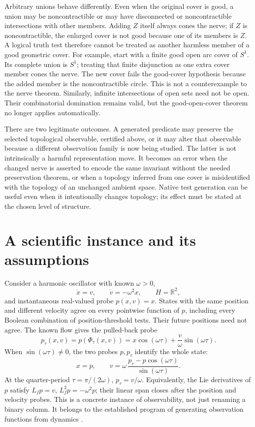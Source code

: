\documentclass[11pt]{article}
\theoremstyle{definition}
\begin{document}
Arbitrary unions behave differently. Even when the original cover is
good, a union may be noncontractible or may have disconnected or
noncontractible intersections with other members. Adding $Z$ itself
always cones the nerve; if $Z$ is noncontractible, the enlarged cover
is not good because one of its members is $Z$. A logical truth test
therefore cannot be treated as another harmless member of a good
geometric cover. For example, start with a finite good open arc cover of $S^1$. Its
complete union is $S^1$; treating that finite disjunction as one extra
cover member cones the nerve. The new cover fails the good-cover
hypothesis because the added member is the noncontractible circle.
This is not a counterexample to the nerve theorem. Similarly, infinite
intersections of open sets need not be open. Their combinatorial domination remains valid, but the
good-open-cover theorem no longer applies automatically.

There are two legitimate outcomes. A generated predicate may preserve
the selected topological observable, certified above, or it may alter
that observable because a different observation family is now being
studied. The latter is not intrinsically a harmful representation move.
It becomes an error when the changed nerve is asserted to encode the
same invariant without the needed preservation theorem, or when a
topology inferred from one cover is misidentified with the topology of
an unchanged ambient space. Native test generation can be useful even
when it intentionally changes topology; its effect must be stated at
the chosen level of structure.


\section{A scientific instance and its assumptions}
\label{sec:oscillator}

Consider a harmonic oscillator with known $\omega>0$,
\[
 \dot x=v,\qquad \dot v=-\omega^2x,
 \qquad H=\mathbb R^2,
\]
and instantaneous real-valued probe $p(x,v)=x$. States with the same
position and different velocity agree on every pointwise function of $p$,
including every Boolean combination of position-threshold tests. Their
future positions need not agree. The known flow gives the pulled-back probe
\[
 p_\tau(x,v)=p(\Phi_\tau(x,v))
     =x\cos(\omega\tau)+\frac{v}{\omega}\sin(\omega\tau).
\]
When $\sin(\omega\tau)\ne0$, the two probes $p,p_\tau$ identify the
whole state:
\[
 x=p,\qquad
 v=\omega\,\frac{p_\tau-p\cos(\omega\tau)}{\sin(\omega\tau)}.
\]
At the quarter-period $\tau=\pi/(2\omega)$, $p_\tau=v/\omega$.
Equivalently, the Lie derivatives of $p$ satisfy
$L_fp=v$, $L_f^2p=-\omega^2p$; their linear span closes after the
position and velocity probes. This is a concrete instance of observability,
not just renaming a binary column. It belongs to the established program
of generating observation functions from dynamics \cite{HermannKrener}.
\end{document}
